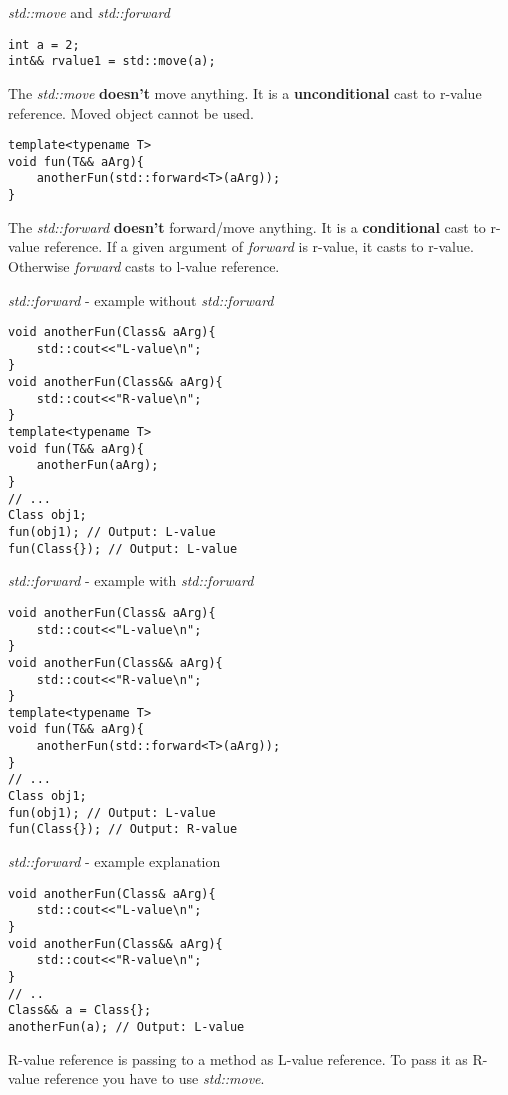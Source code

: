 \documentclass{beamer}
\begin{document}
\begin{frame}[fragile] {\textit{std::move} and \textit{std::forward}}
\begin{lstlisting}[style=customcpp]
int a = 2;
int&& rvalue1 = std::move(a);
\end{lstlisting}
The \textit{std::move} \textbf{doesn't} move anything. It is a \textbf{unconditional} cast to r-value reference. Moved object cannot be used. \\
\begin{lstlisting}[style=customcpp]
template<typename T>
void fun(T&& aArg){
	anotherFun(std::forward<T>(aArg));
}
\end{lstlisting}
The \textit{std::forward} \textbf{doesn't} forward/move anything. It is a \textbf{conditional} cast to r-value reference. If a given argument of \textit{forward} is r-value, it casts to r-value. Otherwise \textit{forward} casts to l-value reference.

\end{frame}

\begin{frame}[fragile] {\textit{std::forward} - example without \textit{std::forward}}
\begin{lstlisting}[style=customcpp]
void anotherFun(Class& aArg){
	std::cout<<"L-value\n";
}
void anotherFun(Class&& aArg){
	std::cout<<"R-value\n";
}
template<typename T>
void fun(T&& aArg){
	anotherFun(aArg);
}
// ...
Class obj1;
fun(obj1); // Output: L-value
fun(Class{}); // Output: L-value
\end{lstlisting}
\end{frame}


\begin{frame}[fragile] {\textit{std::forward} - example with \textit{std::forward}}
\begin{lstlisting}[style=customcpp]
void anotherFun(Class& aArg){
	std::cout<<"L-value\n";
}
void anotherFun(Class&& aArg){
	std::cout<<"R-value\n";
}
template<typename T>
void fun(T&& aArg){
	anotherFun(std::forward<T>(aArg));
}
// ...
Class obj1;
fun(obj1); // Output: L-value
fun(Class{}); // Output: R-value
\end{lstlisting}
\end{frame}

\begin{frame}[fragile] {\textit{std::forward} - example explanation}
\begin{lstlisting}[style=customcpp]
void anotherFun(Class& aArg){
	std::cout<<"L-value\n";
}
void anotherFun(Class&& aArg){
	std::cout<<"R-value\n";
}
// ..
Class&& a = Class{};
anotherFun(a); // Output: L-value
\end{lstlisting}
R-value reference is passing to a method as L-value reference. To pass it as R-value reference you have to use \textit{std::move}.

\end{frame}
\end{document}
